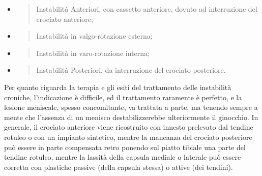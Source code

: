 \documentclass[]{article}
\begin{document}
\begin{itemize}
\item
  \begin{quote}
  Instabilità Anteriori, con cassetto anteriore, dovuto ad interruzione
  del crociato anteriore;
  \end{quote}
\item
  \begin{quote}
  Instabilità in valgo-rotazione esterna;
  \end{quote}
\item
  \begin{quote}
  Instabilità in varo-rotazione interna;
  \end{quote}
\item
  \begin{quote}
  Instabilità Posteriori, da interruzione del crociato posteriore.
  \end{quote}
\end{itemize}

Per quanto riguarda la terapia e gli esiti del trattamento delle
instabilità croniche, l'indicazione è difficile, ed il trattamento
raramente è perfetto, e la lesione meniscale, spesso concomitante, va
trattata a parte, ma tenendo sempre a mente che l'assenza di un menisco
destabilizzerebbe ulteriormente il ginocchio. In generale, il crociato
anteriore viene ricostruito con innesto prelevato dal tendine rotuleo o
con un impianto sintetico, mentre la mancanza del crociato posteriore
può essere in parte compensata retro ponendo sul piatto tibiale una
parte del tendine rotuleo, mentre la lassità della capsula mediale o
laterale può essere corretta con plastiche passive (della capsula
stessa) o attive (dei tendini).
\end{document}
